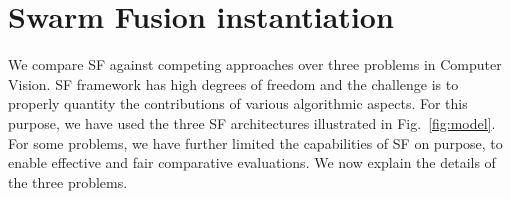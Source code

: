 \section{Swarm Fusion instantiation}
We compare SF against competing approaches over three problems in
Computer Vision. SF framework has high degrees of freedom and the
challenge is to properly quantity the contributions of various
algorithmic aspects. For this purpose, we have used the three SF
architectures illustrated in Fig.~\ref{fig:model}. For some problems, we
have further limited the capabilities of SF on purpose, to enable
effective and fair comparative evaluations. We now explain the details
of the three problems.




